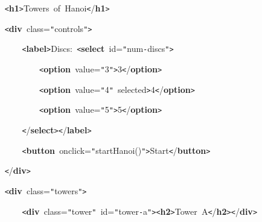 \documentclass[a4paper,10pt]{article}
\def\mc{\relax}
\begin{document}
\noindent
\mbox{}{\tt\mc \ }{\tt\mc \ }{\tt\mc \ }{\tt\mc \ }{\tt <}\textbf{h1}{\tt >}Towers{\tt\mc \ }of{\tt\mc \ }Hanoi{\tt <}/\textbf{h1}{\tt >}

\noindent
\mbox{}\hfill

\noindent
\mbox{}{\tt\mc \ }{\tt\mc \ }{\tt\mc \ }{\tt\mc \ }{\tt <}\textbf{div}{\tt\mc \ }class={\tt "}controls{\tt "}{\tt >}

\noindent
\mbox{}{\tt\mc \ }{\tt\mc \ }{\tt\mc \ }{\tt\mc \ }{\tt\mc \ }{\tt\mc \ }{\tt\mc \ }{\tt\mc \ }{\tt <}\textbf{label}{\tt >}Discs:{\tt\mc \ }{\tt <}\textbf{select}{\tt\mc \ }id={\tt "}num{\tt -}discs{\tt "}{\tt >}

\noindent
\mbox{}{\tt\mc \ }{\tt\mc \ }{\tt\mc \ }{\tt\mc \ }{\tt\mc \ }{\tt\mc \ }{\tt\mc \ }{\tt\mc \ }{\tt\mc \ }{\tt\mc \ }{\tt\mc \ }{\tt\mc \ }{\tt <}\textbf{option}{\tt\mc \ }value={\tt "}3{\tt "}{\tt >}3{\tt <}/\textbf{option}{\tt >}

\noindent
\mbox{}{\tt\mc \ }{\tt\mc \ }{\tt\mc \ }{\tt\mc \ }{\tt\mc \ }{\tt\mc \ }{\tt\mc \ }{\tt\mc \ }{\tt\mc \ }{\tt\mc \ }{\tt\mc \ }{\tt\mc \ }{\tt <}\textbf{option}{\tt\mc \ }value={\tt "}4{\tt "}{\tt\mc \ }selected{\tt >}4{\tt <}/\textbf{option}{\tt >}

\noindent
\mbox{}{\tt\mc \ }{\tt\mc \ }{\tt\mc \ }{\tt\mc \ }{\tt\mc \ }{\tt\mc \ }{\tt\mc \ }{\tt\mc \ }{\tt\mc \ }{\tt\mc \ }{\tt\mc \ }{\tt\mc \ }{\tt <}\textbf{option}{\tt\mc \ }value={\tt "}5{\tt "}{\tt >}5{\tt <}/\textbf{option}{\tt >}

\noindent
\mbox{}{\tt\mc \ }{\tt\mc \ }{\tt\mc \ }{\tt\mc \ }{\tt\mc \ }{\tt\mc \ }{\tt\mc \ }{\tt\mc \ }{\tt <}/\textbf{select}{\tt >}{\tt <}/\textbf{label}{\tt >}

\noindent
\mbox{}{\tt\mc \ }{\tt\mc \ }{\tt\mc \ }{\tt\mc \ }{\tt\mc \ }{\tt\mc \ }{\tt\mc \ }{\tt\mc \ }{\tt <}\textbf{button}{\tt\mc \ }onclick={\tt "}startHanoi(){\tt "}{\tt >}Start{\tt <}/\textbf{button}{\tt >}

\noindent
\mbox{}{\tt\mc \ }{\tt\mc \ }{\tt\mc \ }{\tt\mc \ }{\tt <}/\textbf{div}{\tt >}

\noindent
\mbox{}\hfill

\noindent
\mbox{}{\tt\mc \ }{\tt\mc \ }{\tt\mc \ }{\tt\mc \ }{\tt <}\textbf{div}{\tt\mc \ }class={\tt "}towers{\tt "}{\tt >}

\noindent
\mbox{}{\tt\mc \ }{\tt\mc \ }{\tt\mc \ }{\tt\mc \ }{\tt\mc \ }{\tt\mc \ }{\tt\mc \ }{\tt\mc \ }{\tt <}\textbf{div}{\tt\mc \ }class={\tt "}tower{\tt "}{\tt\mc \ }id={\tt "}tower{\tt -}a{\tt "}{\tt >}{\tt <}\textbf{h2}{\tt >}Tower{\tt\mc \ }A{\tt <}/\textbf{h2}{\tt >}{\tt <}/\textbf{div}{\tt >}
\end{document}
